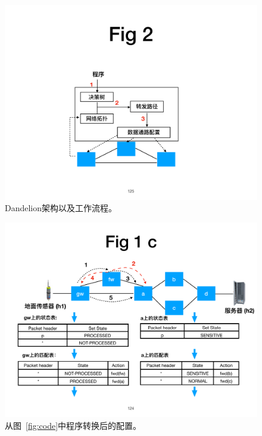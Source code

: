 \begin{figure}[!htbp]
\centering

      \centering\includegraphics[width=\linewidth]{figures/ss-125.pdf}
\caption{Dandelion架构以及工作流程。}
\label{fig:system-workflow}
\end{figure}

\begin{figure}[!htbp]
\centering
      \centering\includegraphics[width=0.8\linewidth]{figures/ss-124.pdf}
    \caption{从图~\ref{fig:code}中程序转换后的配置。}
\label{fig:dsdc-result}
\end{figure}

